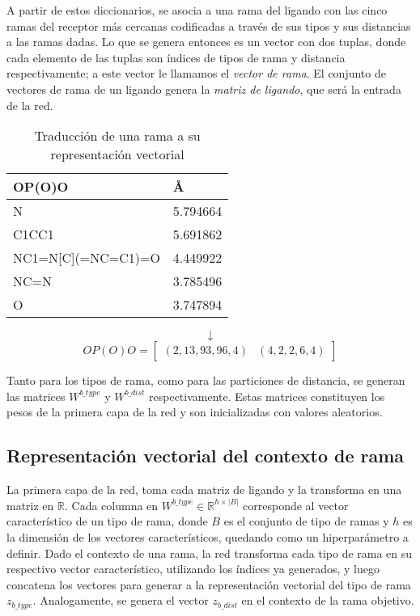A partir de estos diccionarios, se asocia a una rama del ligando con
las cinco ramas del receptor más cercanas codificadas a través de sus
tipos y sus distancias a las ramas dadas. Lo que se genera entonces es
un vector con dos tuplas, donde cada elemento de las tuplas son
índices de tipos de rama y distancia respectivamente; a este vector le
llamamos el \textit{vector de rama}. El conjunto de vectores de rama
de un ligando genera la \textit{matriz de ligando}, que será la
entrada de la red.

\begin{table}[H]
  \begin{center}
  \begin{tabular}{l|l}
    OP(O)O & \AA \\ \hline N & 5.794664 \\ C1CC1 & 5.691862
    \\ NC1=N{[}C{]}(=NC=C1)=O & 4.449922 \\ NC=N & 3.785496 \\ O &
    3.747894
  \end{tabular}
  \end{center}
  \begin{equation*}
  \downarrow
  \end{equation*}
  \begin{equation*}
    OP(O)O=\begin{bmatrix}
    (2, 13, 93, 96, 4) & (4, 2, 2, 6, 4)
    \end{bmatrix}
  \end{equation*}
  \caption{Traducción de una rama a su representación vectorial}
\end{table}

Tanto para los tipos de rama, como para las particiones de distancia, se
generan las matrices $W^{b\_type}$ y $W^{b\_dist}$ respectivamente. Estas
matrices constituyen los pesos de la primera capa de la red y son
inicializadas con valores aleatorios.

\subsection{Representación vectorial del contexto de rama}

La primera capa de la red, toma cada matriz de ligando y la transforma
en una matriz en $\mathbb{R}$. Cada columna en $W^{b\_type} \in
\mathbb{R}^{h\times |B|}$ corresponde al vector característico de un
tipo de rama, donde $B$ es el conjunto de tipo de ramas y $h$ es la
dimensión de los vectores característicos, quedando como un
hiperparámetro a definir.  Dado el contexto de una rama, la red
transforma cada tipo de rama en su respectivo vector característico,
utilizando los índices ya generados, y luego concatena los vectores
para generar a la representación vectorial del tipo de rama
$z_{b\_type}$. Analogamente, se genera el vector $z_{b\_dist}$ en el
contexto de la rama objetivo.

